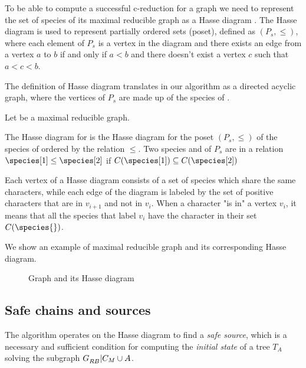 To be able to compute a successful c-reduction for a graph \grb{} we need to represent the set of species of its maximal reducible graph \gm{} as a Hasse diagram \cite{PPPptime2016}.
The Hasse diagram is used to represent partially ordered sets (poset), defined as $(P_{s}, \leq)$, where each element of $P_{s}$ is a vertex in the diagram and there exists an edge from a vertex $a$ to $b$ if and only if $a < b$ and there doesn't exist a vertex $c$ such that $a < c < b$.

The definition of Hasse diagram translates in our algorithm as a directed acyclic graph, where the vertices of $P_{s}$ are made up of the species of \gm{}.

\begin{definition}\label{definition:hasse-diagram}
  Let \gm{} be a maximal reducible graph.

  The Hasse diagram \hasse{} for \gm{} is the Hasse diagram for the poset $(P_{s}, \leq)$ of the species of \gm{} ordered by the relation $\leq$.
  Two species \species[1] and \species[2] of $P_{s}$ are in a relation $\species[1] \leq \species[2]$ if $C(\species[1]) \subseteq C(\species[2])$
\end{definition}

Each vertex of a Hasse diagram \hasse{} consists of a set of species which share the same characters, while each edge  of the diagram is labeled by the set of positive characters that are in $v_{i+1}$ and not in $v_{i}$. When a character \character{} "is in" a vertex $v_{i}$, it means that all the species that label $v_{i}$ have the character \character{} in their set $C(\species{})$.

We show an example of maximal reducible graph and its corresponding Hasse diagram.

\begin{figure}[H]
  

  \caption{Graph \gm{} and its Hasse diagram \hasse{}}\label{figure:4}
\end{figure}

\subsection{Safe chains and sources}\label{section:safe-chains-sources}

The algorithm operates on the Hasse diagram to find a \emph{safe source}, which is a necessary and sufficient condition for computing the \emph{initial state} of a tree $T_{A}$ solving the subgraph $G_{RB}^{}{}|C_{M}{}{} \cup A$.

